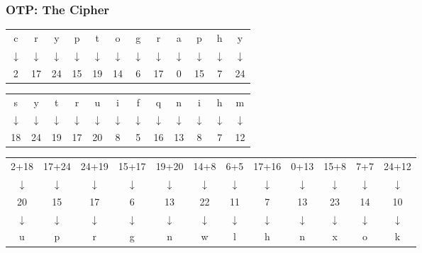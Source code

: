 \documentclass[12pt]{beamer}
\begin{document}
\begin{frame}
\frametitle{OTP: The Cipher}

\begin{center}
\begin{tabular}{cccccccccccc}
c & r & y & p & t & o & g & r & a & p & h & y \\
$\downarrow$ & $\downarrow$ & $\downarrow$ & $\downarrow$ & $\downarrow$ & $\downarrow$ & $\downarrow$ & $\downarrow$ & $\downarrow$ & $\downarrow$ & $\downarrow$ & $\downarrow$  \\
2 & 17 & 24 & 15 & 19 & 14 & 6 & 17 & 0 & 15 & 7 & 24 \\
\end{tabular}
\end{center}

\begin{center}
\begin{tabular}{cccccccccccc}
s & y & t & r & u & i & f & q & n & i & h & m \\
$\downarrow$ & $\downarrow$ & $\downarrow$ & $\downarrow$ & $\downarrow$ & $\downarrow$ & $\downarrow$ & $\downarrow$ & $\downarrow$ & $\downarrow$ & $\downarrow$ & $\downarrow$  \\
18 & 24 & 19 & 17 & 20 & 8 & 5 & 16 & 13 & 8 & 7 & 12 \\
\end{tabular}
\end{center}

\begin{center}
\begin{tabular}{cccccccccccc}
2+18 & 17+24 & 24+19 & 15+17 & 19+20 & 14+8 & 6+5 & 17+16 & 0+13 & 15+8 & 7+7 & 24+12 \\
$\downarrow$ & $\downarrow$ & $\downarrow$ & $\downarrow$ & $\downarrow$ & $\downarrow$ & $\downarrow$ & $\downarrow$ & $\downarrow$ & $\downarrow$ & $\downarrow$ & $\downarrow$  \\
20 & 15 & 17 & 6 & 13 & 22 & 11 & 7 & 13 & 23 & 14 & 10 \\
$\downarrow$ & $\downarrow$ & $\downarrow$ & $\downarrow$ & $\downarrow$ & $\downarrow$ & $\downarrow$ & $\downarrow$ & $\downarrow$ & $\downarrow$ & $\downarrow$ & $\downarrow$  \\
u & p & r & g & n & w & l & h & n & x & o & k
\end{tabular}
\end{center}

\end{frame}
\end{document}
